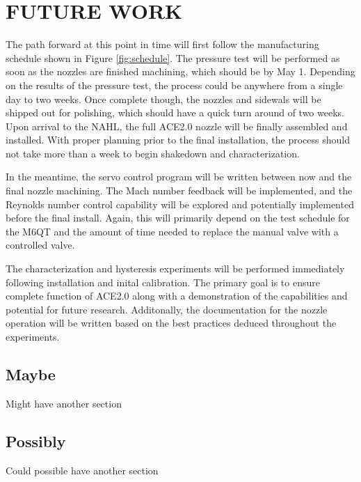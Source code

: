 %
%  
%

\chapter{FUTURE WORK}

The path forward at this point in time will first follow the manufacturing schedule shown in Figure \ref{fig:schedule}. The pressure test will be performed as soon as the nozzles are finished machining, which should be by May 1. Depending on the results of the pressure test, the process could be anywhere from a single day to two weeks. Once complete though, the nozzles and sidewals will be shipped out for polishing, which should have a quick turn around of two weeks. Upon arrival to the NAHL, the full ACE2.0 nozzle will be finally assembled and installed. With proper planning prior to the final installation, the process should not take more than a week to begin shakedown and characterization.

In the meantime, the servo control program will be written between now and the final nozzle machining. The Mach number feedback will be implemented, and the Reynolds number control capability will be explored and potentially implemented before the final install. Again, this will primarily depend on the test schedule for the M6QT and the amount of time needed to replace the manual valve with a controlled valve. 

The characterization and hysteresis experiments will be performed immediately following installation and inital calibration. The primary goal is to ensure complete function of ACE2.0 along with a demonstration of the capabilities and potential for future research. Additonally, the documentation for the nozzle operation will be written based on the best practices deduced throughout the experiments.

\section{Maybe}

Might have another section

\section{Possibly}

Could possible have another section


\nocite{anderson-fundamentals}
\nocite{anderson-compressible}
